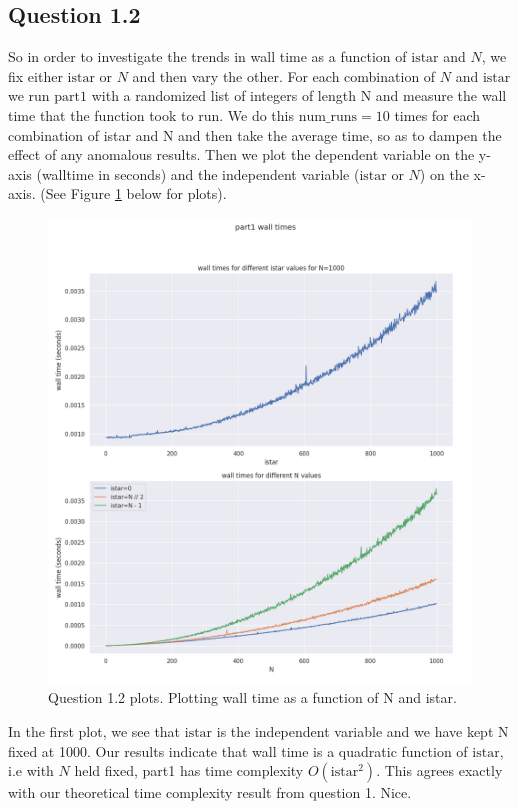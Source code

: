 \documentclass[a4paper, oneside]{book}
\begin{document}
\subsection*{Question 1.2}
So in order to investigate the trends in wall time as a function of $\text{istar}$ and $N$,
we fix either $\text{istar}$ or $N$ and then vary the other. For each combination of $N$ and $\text{istar}$
we run $\text{part1}$ with a randomized list of integers of length N and measure the wall time
that the function took to run.
We do this $\text{num\_runs}=10$ times for each combination of istar and N and then take the
average time, so as to dampen the effect of any anomalous results. Then
we plot the dependent variable on the y-axis (walltime in seconds) and the independent variable ($\text{istar}$ or $N$)
on the x-axis. (See Figure \ref{fig:plots} below for plots).

\begin{figure}[htpb]
    \centering
    \includegraphics[origin=c,width=1.0\textwidth]{./images/sco_fig_1.png}
    \caption{Question 1.2 plots. Plotting wall time as a function of N and istar.}
    \label{fig:plots}
\end{figure}

In the first plot, we see that $\text{istar}$ is the independent variable and we have kept N fixed at 1000.
Our results indicate that wall time is a quadratic function of $\text{istar}$, i.e
with $N$ held fixed, part1 has time complexity $O(\text{istar}^2)$. This agrees exactly with our
theoretical time complexity result from question 1. Nice.
\end{document}

